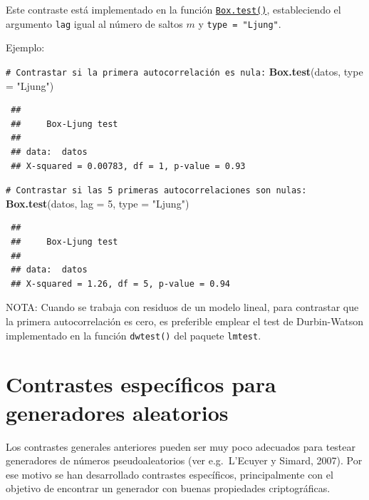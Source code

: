 \documentclass[
  spanish,
  10pt,
]{book}
\newenvironment{Shaded}{\begin{snugshade}}{\end{snugshade}}
\newcommand{\AttributeTok}[1]{\textcolor[rgb]{0.13,0.29,0.53}{#1}}
\newcommand{\CommentTok}[1]{\textcolor[rgb]{0.56,0.35,0.01}{\textit{#1}}}
\newcommand{\DecValTok}[1]{\textcolor[rgb]{0.00,0.00,0.81}{#1}}
\newcommand{\FunctionTok}[1]{\textcolor[rgb]{0.13,0.29,0.53}{\textbf{#1}}}
\newcommand{\NormalTok}[1]{#1}
\newcommand{\StringTok}[1]{\textcolor[rgb]{0.31,0.60,0.02}{#1}}
\theoremstyle{break}
\theoremstyle{nonumberplain}
\renewcommand{\CommentTok}[1]{\textcolor[rgb]{0.41,0.41,0.41}{\texttt{#1}}}
\begin{document}
Este contraste está implementado en la función \href{https://rdrr.io/r/stats/box.test.html}{\texttt{Box.test()}}, estableciendo el argumento \texttt{lag} igual al número de saltos \(m\) y \texttt{type\ =\ "Ljung"}.

Ejemplo:

\begin{Shaded}
\begin{Highlighting}[]
\CommentTok{\# Contrastar si la primera autocorrelación es nula:}
\FunctionTok{Box.test}\NormalTok{(datos, }\AttributeTok{type =} \StringTok{"Ljung"}\NormalTok{) }
\end{Highlighting}
\end{Shaded}

\begin{verbatim}
 ## 
 ##     Box-Ljung test
 ## 
 ## data:  datos
 ## X-squared = 0.00783, df = 1, p-value = 0.93
\end{verbatim}

\begin{Shaded}
\begin{Highlighting}[]
\CommentTok{\# Contrastar si las 5 primeras autocorrelaciones son nulas:}
\FunctionTok{Box.test}\NormalTok{(datos, }\AttributeTok{lag =} \DecValTok{5}\NormalTok{, }\AttributeTok{type =} \StringTok{"Ljung"}\NormalTok{) }
\end{Highlighting}
\end{Shaded}

\begin{verbatim}
 ## 
 ##     Box-Ljung test
 ## 
 ## data:  datos
 ## X-squared = 1.26, df = 5, p-value = 0.94
\end{verbatim}

NOTA: Cuando se trabaja con residuos de un modelo lineal, para contrastar que la primera autocorrelación es cero, es preferible emplear el test de
Durbin-Watson implementado en la función \texttt{dwtest()} del paquete \texttt{lmtest}.

\section{Contrastes específicos para generadores aleatorios}\label{contrastes-especuxedficos-para-generadores-aleatorios}

Los contrastes generales anteriores pueden ser muy poco adecuados para testear generadores de números pseudoaleatorios (ver e.g.~L'Ecuyer y Simard, 2007). Por ese motivo se han desarrollado contrastes específicos, principalmente con el objetivo de encontrar un generador con buenas propiedades criptográficas.
\end{document}
